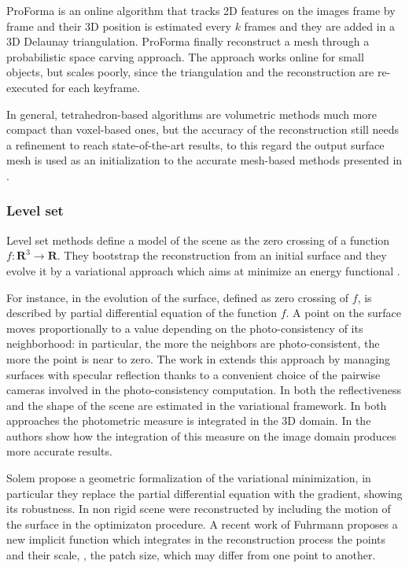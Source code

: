 ProForma \cite{Pan_et_al09} is an online algorithm that tracks 2D features on the images frame by frame and their 3D position is estimated every $k$ frames and they are added in a 3D Delaunay triangulation. ProForma finally reconstruct a mesh through a probabilistic space carving approach. The approach works online for small objects, but scales poorly, since the triangulation and the reconstruction are re-executed for each keyframe.

In general, tetrahedron-based algorithms are volumetric methods  much more compact than voxel-based ones, but the accuracy of the reconstruction still needs a refinement to reach state-of-the-art results, to this regard the output surface mesh is used as an initialization to the accurate mesh-based methods presented in \cite{vu_et_al_2012,hiep2009towards,salman2010surface}.

\subsubsection{Level set}
Level set methods define a model of the scene as the zero crossing of a function $f:\mathbf{R}^3\rightarrow\mathbf{R}$. 
They bootstrap the reconstruction from an initial surface and they evolve it by a variational approach which aims at minimize an energy functional \cite{faugeras2002variational,jin2002variational,yezzi2003stereoscopic,fuhrmann2014floating,solem2005geometric,yoon2010joint,pons2007multi}.

For instance, in \cite{faugeras2002variational} the evolution of the surface, defined as zero crossing of $f$, is described by partial differential equation of the function $f$. A point on the surface moves proportionally to a value depending on the photo-consistency of its neighborhood: in particular, the more the neighbors are photo-consistent, the more the point is near to zero.
The work in \cite{jin2002variational} extends this approach by managing surfaces with specular reflection thanks to a convenient choice of the pairwise cameras involved in the photo-consistency computation. In \cite{yoon2010joint} both the reflectiveness and the shape of the scene are estimated in the variational framework.
In both approaches the photometric measure is integrated in the 3D domain. In \cite{yezzi2003stereoscopic} the authors show how the integration of this measure on the image domain produces more accurate results.

Solem \etal \cite{solem2005geometric} propose a geometric formalization of the variational minimization, in particular they replace the partial differential equation with the gradient, showing its robustness.
In \cite{pons2005modelling,pons2007multi} non rigid scene were reconstructed by including the motion of the surface in the optimizaton procedure.
A recent work of Fuhrmann \etal \cite{fuhrmann2014floating} proposes a new implicit function which integrates in the reconstruction process the points and their scale, \eg, the patch size, which may differ from one point to another. 

